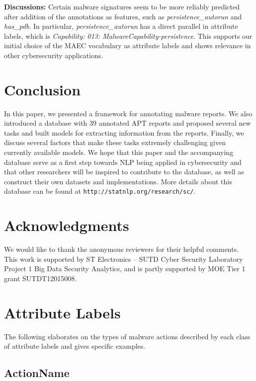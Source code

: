 \documentclass[11pt,a4paper]{article}
\begin{document}
\textbf{Discussions:} Certain malware signatures seem to be more reliably predicted after addition of the annotations as features, such as \emph{persistence\_autorun} and \emph{has\_pdb}. In particular, \emph{persistence\_autorun} has a direct parallel in attribute labels, which is \emph{Capability: 013: MalwareCapability-persistence}. This supports our initial choice of the MAEC vocabulary as attribute labels and shows relevance in other cybersecurity applications. 

\section{Conclusion}

In this paper, we presented a framework for annotating malware reports. We also introduced a database with 39 annotated APT reports and proposed several new tasks and built models for extracting information from the reports. Finally, we discuss several factors that make these tasks extremely challenging given currently available models. We hope that this paper and the accompanying database serve as a first step towards NLP being applied in cybersecurity and that other researchers will be inspired to contribute to the database, as well as construct their own datasets and implementations. More details about this database can be found at \texttt{http://statnlp.org/research/sc/}.

\section*{Acknowledgments}

We would like to thank the anonymous reviewers for their helpful comments. This work is supported by ST Electronics -- SUTD Cyber Security Laboratory Project 1 Big Data Security Analytics, and is partly supported by MOE Tier 1 grant SUTDT12015008.




\appendix

\section{Attribute Labels}
\label{sec:labels}

The following elaborates on the types of malware actions described by each class of attribute labels and gives specific examples.

\subsection{ActionName}
\end{document}
